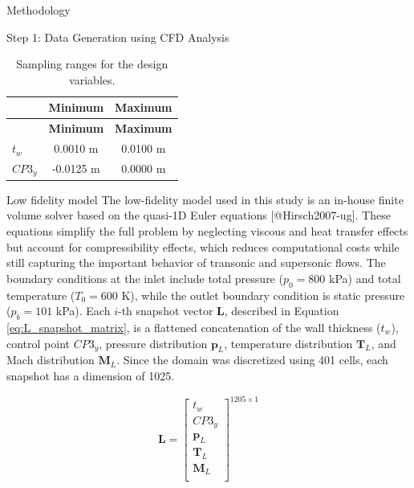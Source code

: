 \begin{frame}{Methodology}
\begin{block}{Step 1: Data Generation using CFD Analysis}
\hypertarget{tab:lhs}{}
\begin{longtable}[]{@{}lcc@{}}
\caption{Sampling ranges for the design variables.}\tabularnewline
\toprule()
& \textbf{Minimum} & \textbf{Maximum} \\
\midrule()
\endfirsthead
\toprule()
& \textbf{Minimum} & \textbf{Maximum} \\
\midrule()
\endhead
\(t_w\) & 0.0010 m & 0.0100 m \\
\(CP3_y\) & -0.0125 m & 0.0000 m \\
\bottomrule()
\end{longtable}

\begin{block}{Low fidelity model}
\protect\hypertarget{low-fidelity-model}{}
The low-fidelity model used in this study is an in-house finite volume
solver based on the quasi-1D Euler equations {[}@Hirsch2007-ug{]}. These
equations simplify the full problem by neglecting viscous and heat
transfer effects but account for compressibility effects, which reduces
computational costs while still capturing the important behavior of
transonic and supersonic flows. The boundary conditions at the inlet
include total pressure (\(p_0=800\) kPa) and total temperature
(\(T_0=600\) K), while the outlet boundary condition is static pressure
(\(p_b=101\) kPa). Each \(i\)-th snapshot vector \(\mathbf{L}\),
described in Equation
\protect\hyperlink{eq:L_snapshot_matrix}{{[}eq:L\_snapshot\_matrix{]}},
is a flattened concatenation of the wall thickness (\(t_w\)), control
point \(CP3_y\), pressure distribution \(\mathbf{p}_L\), temperature
distribution \(\mathbf{T}_L\), and Mach distribution \(\mathbf{M}_L\).
Since the domain was discretized using 401 cells, each snapshot has a
dimension of 1025.

\[\mathbf{L} = 
\begin{bmatrix}
    t_w \\
    CP3_y \\
    \mathbf{p}_L\\
    \mathbf{T}_L \\
    \mathbf{M}_L \\
\end{bmatrix}^{1205 \times 1}
    \label{eq:L_snapshot_matrix}\]
\end{block}


\end{block}
\end{frame}
